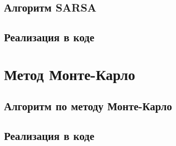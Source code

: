 \subsection{Алгоритм SARSA}

\subsection{Реализация в коде}

\section{Метод Монте-Карло}

\subsection{Алгоритм по методу Монте-Карло}

\subsection{Реализация в коде}




